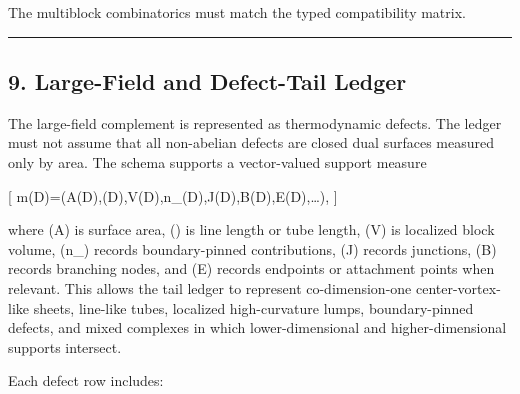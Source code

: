 \documentclass[
]{article}
\begin{document}
The multiblock combinatorics must match the typed compatibility matrix.

\begin{center}\rule{0.5\linewidth}{0.5pt}\end{center}

\subsection{9. Large-Field and Defect-Tail
Ledger}\label{large-field-and-defect-tail-ledger}

The large-field complement is represented as thermodynamic defects. The
ledger must not assume that all non-abelian defects are closed dual
surfaces measured only by area. The schema supports a vector-valued
support measure

{[}
\mathbf m(D)=(A(D),\ell(D),V(D),n\_\partial(D),J(D),B(D),E(D),\ldots),
{]}

where (A) is surface area, (\ell) is line length or tube length, (V) is
localized block volume, (n\_\partial) records boundary-pinned
contributions, (J) records junctions, (B) records branching nodes, and
(E) records endpoints or attachment points when relevant. This allows
the tail ledger to represent co-dimension-one center-vortex-like sheets,
line-like tubes, localized high-curvature lumps, boundary-pinned
defects, and mixed complexes in which lower-dimensional and
higher-dimensional supports intersect.

Each defect row includes:
\end{document}
